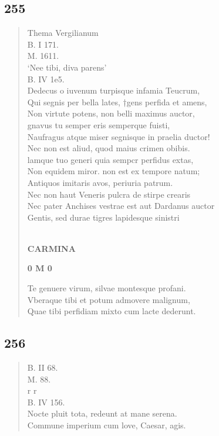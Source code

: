 \documentclass[11pt, a4paper]{report}
\begin{document}
            \subsection*{255}
      \begin{verse}
      Thema Vergilianum \\ B. I 171. \\ M. 1611. \\ ‘Nee tibi, diva parens’ \\ B. IV 1e5. \\ Dedecus o iuvenum turpisque infamia Teucrum, \\ Qui segnis per bella lates, †gens perfida et amens, \\ Non virtute potens, non belli maximus auctor, \\ gnavus tu semper eris semperque fuisti, \\ Naufragus atque miser segnisque in praelia ductor! \\ Nec non est aliud, quod maius crimen obibis. \\ lamque tuo generi quia sempcr perfidus extas, \\ Non equidem miror. non est ex tempore natum; \\ Antiquos imitaris avos, periuria patrum. \\ Nec non haut Veneris pulcra de stirpe crearis \\ Nec pater Anchises vestrae  \lbrack est \rbrack  aut Dardanus auctor \\ Gentis, sed durae tigres lapidesque sinistri \\ 
        ﻿\pagebreak 
    \begin{center} \textbf{CARMINA} \end{center}\begin{center} \textbf{0 M 0} \end{center}Te genuere virum, silvae montesque profani. \\ Vberaque tibi et potum admovere malignum, \\ Quae tibi perfidiam mixto cum lacte dederunt. \\ 
      \end{verse}
  
            \subsection*{256}
      \begin{verse}
      B. II 68. \\ M. 88. \\ r r \\ B. IV 156. \\ Nocte pluit tota, redeunt at mane serena. \\ Commune imperium cum love, Caesar, agis. \\ 
      \end{verse}
  
\end{document}
